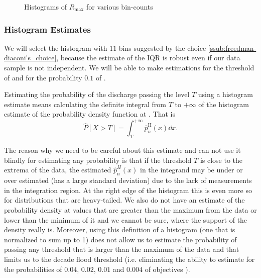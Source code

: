 \begin{figure}[H]
    \centering
  \begin{subfigure}{0.4\textwidth}
    \centering
  \end{subfigure}

  \begin{subfigure}{0.4\textwidth}
    \centering
  \end{subfigure}
  \begin{subfigure}{0.4\textwidth}
    \centering
  \end{subfigure}
  \caption{Histograms of \(R_{\max}\) for various bin-counts}
  \label{fig:histograms}
\end{figure}


\subsubsection{Histogram Estimates}%
\label{ssub:histogram_estimates}
We will select the histogram with \(11\) bins suggested by the choice \ref{ssub:freedman-diaconi's_choice}, because
the estimate of the \ac{IQR} is robust even if our data sample is not independent. We will be able to make
estimations for the threshold of  and for the probability \(0.1\) of .

Estimating the probability of the discharge passing the level \(T\) using a histogram estimate means calculating the
definite integral from \(T\) to \(+\infty\) of the histogram estimate of the probability density function at
. That is \[
    \hat{P}[X > T] = \int_{T}^{+\infty} \hat{p}_n^{\text{H}}(x) \dd{x}.
\] 

The reason why we need to be careful about this estimate and can not use it blindly for estimating any probability is
that if the threshold \(T\) is close to the extrema of the data, the estimated \(\hat{p}^H_n(x)\) in the integrand 
may be under or over estimated (has a large standard deviation) due to the lack of measurements in the integration
region. At the right edge of the histogram this is even more so
for distributions that are heavy-tailed. We also do not have an estimate of the probability density at values that are
greater than the maximum from the data or lower than the minimum of it and we cannot be sure, where the support of the
density really is. Moreover, using this definition of a histogram (one that is normalized to sum up to 1) does not 
allow us to estimate the probability of passing any threshold that is larger than the maximum of the data and that
limits us to the decade flood threshold (i.e. eliminating the ability to estimate for the probabilities of \(0.04\),
\(0.02\), \(0.01\) and \(0.004\) of objectives ).


